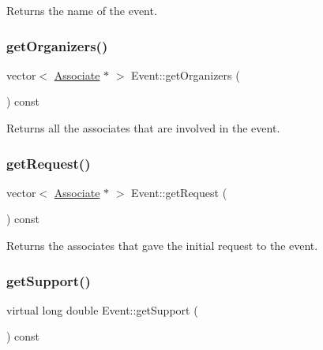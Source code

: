 Returns the name of the event. 

\mbox{\label{classEvent_a7e09dd7707422e30104727a069573e88}} 
\subsubsection{\texorpdfstring{get\+Organizers()}{getOrganizers()}}
{\footnotesize\ttfamily vector$<$ \hyperlink{classAssociate}{Associate} $\ast$ $>$ Event\+::get\+Organizers (\begin{DoxyParamCaption}{ }\end{DoxyParamCaption}) const}



Returns all the associates that are involved in the event. 

\mbox{\label{classEvent_a424a2862591a8437b0d18366c7aee247}} 
\subsubsection{\texorpdfstring{get\+Request()}{getRequest()}}
{\footnotesize\ttfamily vector$<$ \hyperlink{classAssociate}{Associate} $\ast$ $>$ Event\+::get\+Request (\begin{DoxyParamCaption}{ }\end{DoxyParamCaption}) const}



Returns the associates that gave the initial request to the event. 

\mbox{\label{classEvent_a9170bfcbd9b00015dafc5d5cc69a2cfe}} 
\subsubsection{\texorpdfstring{get\+Support()}{getSupport()}}
{\footnotesize\ttfamily virtual long double Event\+::get\+Support (\begin{DoxyParamCaption}{ }\end{DoxyParamCaption}) const\hspace{0.3cm}{\ttfamily [pure virtual]}}



